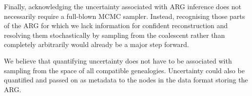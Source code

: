 \documentclass{article}
\newcommand{\tsinfer}[0]{\texttt{tsinfer}}
\newcommand{\kwarg}[0]{\texttt{KwARG}}
\newcommand{\argneedle}[0]{\texttt{ARG-Needle}}
\newcommand{\argweaver}[0]{\texttt{ARGweaver}}
\newcommand{\relate}[0]{\texttt{Relate}}
\begin{document}
Finally, acknowledging the uncertainty associated with ARG inference does not
necessarily require a full-blown MCMC sampler. Instead, recognising those parts of
the ARG for which we lack information for confident reconstruction and resolving
them stochastically by sampling from the coalescent rather than completely arbitrarily
would already be a major step forward. 

We believe that quantifying uncertainty does not have to be associated with sampling
from the space of all compatible genealogies. Uncertainty could also
be quantified and passed on as metadata to the nodes in the data format storing the ARG.





\end{document}
